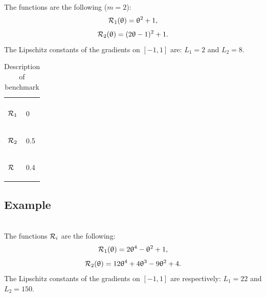 \documentclass[article,authoryear,jmlmc]{beg_32}             %
\begin{document}
The functions are the following ($m=2$):
\begin{equation*}
	\mathcal{R}_1(\uptheta) = \uptheta^2+1,
\end{equation*}
\begin{equation*}
	\mathcal{R}_2(\uptheta) = (2\uptheta-1)^2+1.
\end{equation*}
The Lipschitz constants of the gradients on $[-1,1]$ are: $L_1=2$ and $L_2=8$.

\begin{table}[h!]
	\centering
	\caption{Description of benchmark \exOne}
	\begin{tabular}{ll}
		
		\begin{bf} \diagbox{Functions}{Minimums} \end{bf} & \begin{bf}\mg\end{bf} \\ 
		
		\begin{bf}$\mathcal{R}_1$\end{bf} &  0   \\ 
		\begin{bf}$\mathcal{R}_2$\end{bf} &  0.5 \\ 
		\begin{bf}$\mathcal{R}$\end{bf}   &  0.4 \\ 
	\end{tabular}
	\label{ex1_example}
\end{table}

\subsection{Example \exTwo}
~~\\
The functions $\mathcal{R}_i$ are the following:
\begin{equation*}
	\mathcal{R}_1(\uptheta) = 2\uptheta^4-\uptheta^2+1,
\end{equation*}
\begin{equation*}
	\mathcal{R}_2(\uptheta) = 12\uptheta^4+4\uptheta^3-9\uptheta^2+4.
\end{equation*}
The Lipschitz constants of the gradients on $[-1,1]$ are respectively: $L_1=22$ and $L_2=150$.
\end{document}
